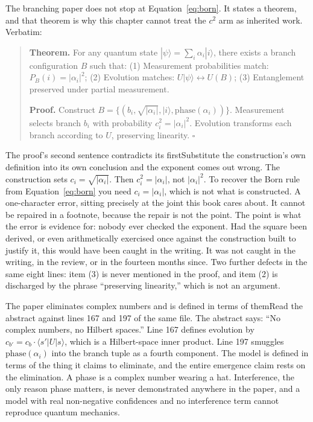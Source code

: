 The branching paper does not stop at Equation~\ref{eq:born}. It states a theorem, and that theorem is why this chapter cannot treat the $c^2$ arm as inherited work. Verbatim:

\begin{quote}
\textbf{Theorem.} For any quantum state $|\psi\rangle = \sum_i \alpha_i |i\rangle$, there exists a branch configuration $B$ such that: (1) Measurement probabilities match: $P_B(i) = |\alpha_i|^2$; (2) Evolution matches: $U|\psi\rangle \leftrightarrow U(B)$; (3) Entanglement preserved under partial measurement.

\textbf{Proof.} Construct $B = \{(b_i, \sqrt{|\alpha_i|}, |i\rangle, \mathrm{phase}(\alpha_i))\}$. Measurement selects branch $b_i$ with probability $c_i^2 = |\alpha_i|^2$. Evolution transforms each branch according to $U$, preserving linearity. $\square$
\end{quote}

\begin{Correspondence}{The proof's second sentence contradicts its first}{Substitute the construction's own definition into its own conclusion and the exponent comes out wrong.}
The construction sets $c_i = \sqrt{|\alpha_i|}$. Then $c_i^2 = |\alpha_i|$, not $|\alpha_i|^2$. To recover the Born rule from Equation~\ref{eq:born} you need $c_i = |\alpha_i|$, which is not what is constructed.
A one-character error, sitting precisely at the joint this book cares about. It cannot be repaired in a footnote, because the repair is not the point. The point is what the error is evidence for: nobody ever checked the exponent. Had the square been derived, or even arithmetically exercised once against the construction built to justify it, this would have been caught in the writing. It was not caught in the writing, in the review, or in the fourteen months since. Two further defects in the same eight lines: item (3) is never mentioned in the proof, and item (2) is discharged by the phrase ``preserving linearity,'' which is not an argument.
\end{Correspondence}

\begin{Correspondence}{The paper eliminates complex numbers and is defined in terms of them}{Read the abstract against lines 167 and 197 of the same file.}
The abstract says: ``No complex numbers, no Hilbert spaces.'' Line 167 defines evolution by $c_{b'} = c_b \cdot \langle s'|U|s\rangle$, which is a Hilbert-space inner product. Line 197 smuggles $\mathrm{phase}(\alpha_i)$ into the branch tuple as a fourth component.
The model is defined in terms of the thing it claims to eliminate, and the entire emergence claim rests on the elimination. A phase is a complex number wearing a hat. Interference, the only reason phase matters, is never demonstrated anywhere in the paper, and a model with real non-negative confidences and no interference term cannot reproduce quantum mechanics.
\end{Correspondence}

